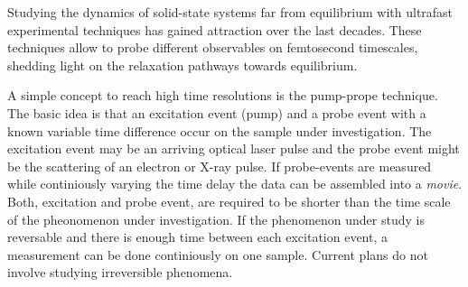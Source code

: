 Studying the dynamics of solid-state systems far from equilibrium with ultrafast experimental techniques has gained attraction over the last decades.
These techniques allow to probe different observables on femtosecond timescales, shedding light on the relaxation pathways towards equilibrium.

A simple concept to reach high time resolutions is the pump-prope technique.
The basic idea is that an excitation event (pump) and a probe event with a known variable time difference occur on the sample under investigation.
The excitation event may be an arriving optical laser pulse and the probe event might be the scattering of an electron or X-ray pulse.
If probe-events are measured while continiously varying the time delay the data can be assembled into a \emph{movie}.
Both, excitation and probe event, are required to be shorter than the time scale of the pheonomenon under investigation.
If the phenomenon under study is reversable and there is enough time between each excitation event, a measurement can be done continiously on one sample.
Current plans do not involve studying irreversible phenomena.



